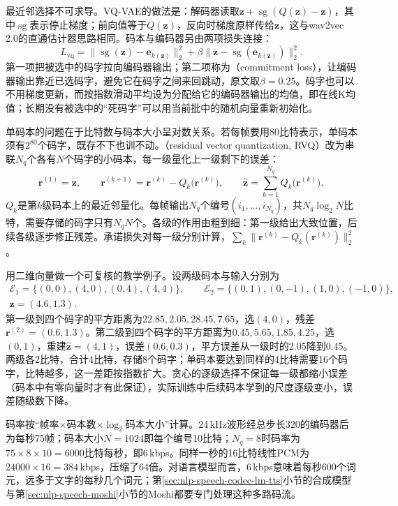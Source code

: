最近邻选择不可求导。VQ-VAE的做法是：解码器读取$\bm z+\operatorname{sg}(Q(\bm z)-\bm z)$，其中$\operatorname{sg}$表示停止梯度；前向值等于$Q(\bm z)$，反向时梯度原样传给$\bm z$，这与wav2vec 2.0的直通估计器思路相同\cite{nlp-speech-oord2017vqvae}。码本与编码器另由两项损失连接：
\begin{equation}
 L_{\mathrm{vq}}=\bigl\lVert\operatorname{sg}(\bm z)-\bm e_{k(\bm z)}\bigr\rVert_2^2
 +\beta\bigl\lVert\bm z-\operatorname{sg}(\bm e_{k(\bm z)})\bigr\rVert_2^2 .
 \label{eq:nlp-speech-vq}
\end{equation}
第一项把被选中的码字拉向编码器输出；第二项称为（commitment loss），让编码器输出靠近已选码字，避免它在码字之间来回跳动，原文取$\beta=0.25$。码字也可以不用梯度更新，而按指数滑动平均设为分配给它的编码器输出的均值，即在线K均值；长期没有被选中的“死码字”可以用当前批中的随机向量重新初始化。

单码本的问题在于比特数与码本大小呈对数关系。若每帧要用80比特表示，单码本须有$2^{80}$个码字，既存不下也训不动。（residual vector quantization, RVQ）改为串联$N_q$个各有$N$个码字的小码本，每一级量化上一级剩下的误差：
\begin{equation}
 \bm r^{(1)}=\bm z,\qquad
 \bm r^{(k+1)}=\bm r^{(k)}-Q_k\bigl(\bm r^{(k)}\bigr),\qquad
 \hat{\bm z}=\sum_{k=1}^{N_q}Q_k\bigl(\bm r^{(k)}\bigr),
 \label{eq:nlp-speech-rvq}
\end{equation}
$Q_k$是第$k$级码本上的最近邻量化。每帧输出$N_q$个编号$(i_1,\ldots,i_{N_q})$，共$N_q\log_2N$比特，需要存储的码字只有$N_qN$个。各级的作用由粗到细：第一级给出大致位置，后续各级逐步修正残差。承诺损失对每一级分别计算，$\sum_k\lVert\bm r^{(k)}-Q_k(\bm r^{(k)})\rVert_2^2$。

用二维向量做一个可复核的教学例子。设两级码本与输入分别为
\[
 \begin{gathered}
 \mathcal E_1=\{(0,0),(4,0),(0,4),(4,4)\},\qquad
 \mathcal E_2=\{(0,1),(0,-1),(1,0),(-1,0)\},\\
 \bm z=(4.6,1.3).
 \end{gathered}
\]
第一级到四个码字的平方距离为$22.85,2.05,28.45,7.65$，选$(4,0)$，残差$\bm r^{(2)}=(0.6,1.3)$。第二级到四个码字的平方距离为$0.45,5.65,1.85,4.25$，选$(0,1)$，重建$\hat{\bm z}=(4,1)$，误差$(0.6,0.3)$，平方误差从一级时的2.05降到0.45。两级各2比特，合计4比特，存储8个码字；单码本要达到同样的4比特需要16个码字，比特越多，这一差距按指数扩大。贪心的逐级选择不保证每一级都缩小误差（码本中有零向量时才有此保证），实际训练中后续码本学到的尺度逐级变小，误差随级数下降。

码率按“帧率$\times$码本数$\times\log_2$码本大小”计算。24\,kHz波形经总步长320的编码器后为每秒75帧；码本大小$N=1024$即每个编号10比特；$N_q=8$时码率为$75\times8\times10=6000$比特每秒，即6\,kbps。同样一秒的16比特线性PCM为$24000\times16=384$\,kbps，压缩了64倍。对语言模型而言，6\,kbps意味着每秒600个词元，远多于文字的每秒几个词元；第\ref{sec:nlp-speech-codec-lm-tts}小节的合成模型与第\ref{sec:nlp-speech-moshi}小节的Moshi都要专门处理这种多路码流。

